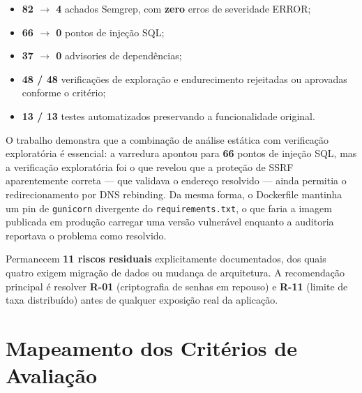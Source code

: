 \documentclass[12pt,a4paper]{article}
\begin{document}
\begin{itemize}
  \item \textbf{82 $\rightarrow$ 4} achados Semgrep, com \textbf{zero} erros
  de severidade \textsc{ERROR};
  \item \textbf{66 $\rightarrow$ 0} pontos de injeção SQL;
  \item \textbf{37 $\rightarrow$ 0} advisories de dependências;
  \item \textbf{48 / 48} verificações de exploração e endurecimento
  rejeitadas ou aprovadas conforme o critério;
  \item \textbf{13 / 13} testes automatizados preservando a funcionalidade
  original.
\end{itemize}

O trabalho demonstra que a combinação de análise estática com verificação
exploratória é essencial: a varredura apontou para \textbf{66} pontos de
injeção SQL, mas a verificação exploratória foi o que revelou que a proteção
de SSRF aparentemente correta --- que validava o endereço resolvido --- ainda
permitia o redirecionamento por DNS rebinding. Da mesma forma, o Dockerfile
mantinha um pin de \texttt{gunicorn} divergente do \texttt{requirements.txt},
o que faria a imagem publicada em produção carregar uma versão vulnerável
enquanto a auditoria reportava o problema como resolvido.

Permanecem \textbf{11 riscos residuais} explicitamente documentados, dos quais
quatro exigem migração de dados ou mudança de arquitetura. A recomendação
principal é resolver \textbf{R-01} (criptografia de senhas em repouso) e
\textbf{R-11} (limite de taxa distribuído) antes de qualquer exposição real
da aplicação.

\section{Mapeamento dos Critérios de Avaliação}
\end{document}
